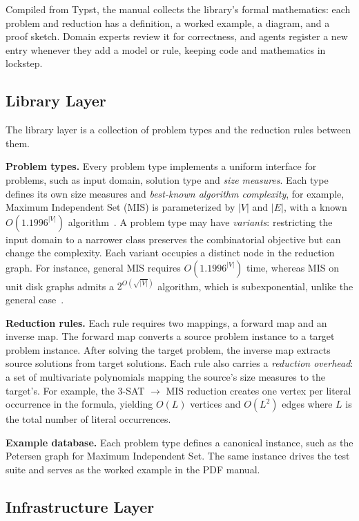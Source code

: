 \documentclass{article}
\begin{document}
Compiled from Typst, the manual collects the library's formal mathematics: each problem and reduction has a definition, a worked example, a diagram, and a proof sketch.
Domain experts review it for correctness, and agents register a new entry whenever they add a model or rule, keeping code and mathematics in lockstep.

\subsection{Library Layer}\label{sec:graph-structure}

The library layer is a collection of problem types and the reduction rules between them.

\textbf{Problem types.}
Every problem type implements a uniform interface for problems, such as input domain, solution type and \emph{size measures}.
Each type defines its own size measures and \emph{best-known algorithm complexity}, for example, Maximum Independent Set (MIS) is parameterized by $|V|$ and $|E|$, with a known $O(1.1996^{|V|})$ algorithm~\cite{Xiao2017MIS}.
A problem type may have \emph{variants}: restricting the input domain to a narrower class preserves the combinatorial objective but can change the complexity.
Each variant occupies a distinct node in the reduction graph.
For instance, general MIS requires $O(1.1996^{|V|})$ time, whereas MIS on unit disk graphs admits a $2^{O(\sqrt{|V|})}$ algorithm, which is subexponential, unlike the general case~\cite{deBerg2020ETHTight}.

\textbf{Reduction rules.}
Each rule requires two mappings, a forward map and an inverse map. The forward map converts a source problem instance to a target problem instance.
After solving the target problem, the inverse map extracts source solutions from target solutions.
Each rule also carries a \emph{reduction overhead}: a set of multivariate polynomials mapping the source's size measures to the target's.
For example, the 3-SAT $\to$ MIS reduction creates one vertex per literal occurrence in the formula, yielding $O(L)$ vertices and $O(L^2)$ edges where $L$ is the total number of literal occurrences.

\textbf{Example database.}
Each problem type defines a canonical instance, such as the Petersen graph for Maximum Independent Set.
The same instance drives the test suite and serves as the worked example in the PDF manual.

\subsection{Infrastructure Layer}\label{sec:infrastructure}
\end{document}
